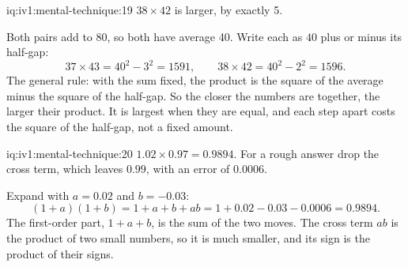 \begin{solution}{iq:iv1:mental-technique:19}
$38 \times 42$ is larger, by exactly 5.

Both pairs add to 80, so both have average 40. Write each as $40$ plus or minus its half-gap:
\[
37 \times 43 = 40^2 - 3^2 = 1591, \qquad 38 \times 42 = 40^2 - 2^2 = 1596.
\]
The general rule: with the sum fixed, the product is the square of the average minus the square of the half-gap. So the closer the numbers are together, the larger their product. It is largest when they are equal, and each step apart costs the square of the half-gap, not a fixed amount.

\end{solution}

\begin{solution}{iq:iv1:mental-technique:20}
$1.02 \times 0.97 = 0.9894$. For a rough answer drop the cross term, which leaves $0.99$, with an error of $0.0006$.

Expand with $a = 0.02$ and $b = -0.03$:
\[
(1 + a)(1 + b) = 1 + a + b + ab = 1 + 0.02 - 0.03 - 0.0006 = 0.9894.
\]
The first-order part, $1 + a + b$, is the sum of the two moves. The cross term $ab$ is the product of two small numbers, so it is much smaller, and its sign is the product of their signs.

\end{solution}

